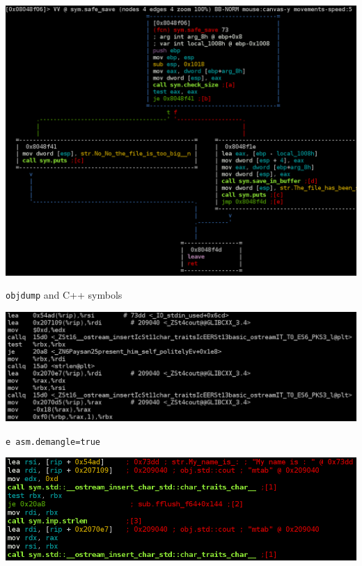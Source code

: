 {\begin{frame}[plain]
  \begin{center}
    \includegraphics[width=\textwidth]{./images/radare-disas2.png}
  \end{center}
\end{frame}

\begin{frame}[plain]
  \begin{center}
    \color{white} \texttt{objdump} and C++ symbols

    \vspace{2em}

    \includegraphics[width=\textwidth]{./images/objdump-cpp.png}
  \end{center}
\end{frame}

\begin{frame}
  \begin{center}
    \color{white} \verb+e asm.demangle=true+

    \vspace{2em}

    \includegraphics[width=\textwidth]{./images/r2-cpp.png}
  \end{center}
\end{frame}
}

